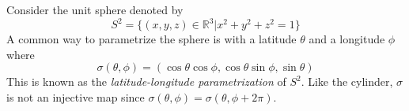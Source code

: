 \begin{example}
  Consider the unit sphere denoted by
  \[
S^{2} = \{(x, y, z)\in \mathbb{R}^{3} | x^{2} + y^{2} + z^{2} = 1\}
\]
  A common way to parametrize the sphere is with a latitude \(\theta\) and a longitude \(\phi\) where
  \[
\sigma(\theta, \phi) = (\cos \theta \cos \phi, \cos \theta \sin \phi, \sin \theta)
\]
  This is known as the \textit{latitude-longitude parametrization} of \(S^{2}\).
  Like the cylinder, \(\sigma\) is not an injective map since \(\sigma (\theta, \phi) = \sigma(\theta, \phi + 2\pi)\).
\end{example}
